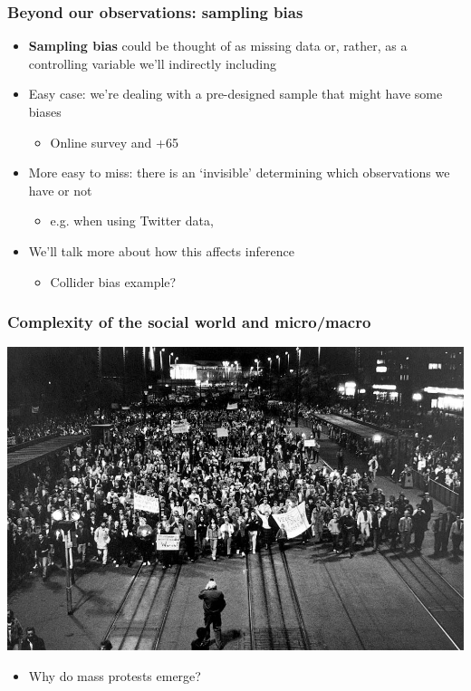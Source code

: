 \documentclass[aspectratio=43]{beamer}
\begin{document}
\begin{frame}
\frametitle{Beyond our observations: sampling bias}
\centering

\begin{itemize}
  \item \textbf{Sampling bias} could be thought of as missing data or, rather, as a controlling variable we'll indirectly including
  \item Easy case: we're dealing with a pre-designed sample that might have some biases
  \begin{itemize}
    \item Online survey and +65
  \end{itemize}
  \item More easy to miss: there is an `invisible' determining which observations we have or not
  \begin{itemize}
    \item e.g. when using Twitter data,
  \end{itemize}
  \item We'll talk more about how this affects inference
  \begin{itemize}
    \item Collider bias example?
  \end{itemize}
\end{itemize}


\end{frame}

\begin{frame}
\frametitle{Complexity of the social world and micro/macro}
\centering

\includegraphics[width = \textwidth]{../img/leipzig1989}

\begin{itemize}
  \item Why do mass protests emerge?
\end{itemize}

\end{frame}
\end{document}
